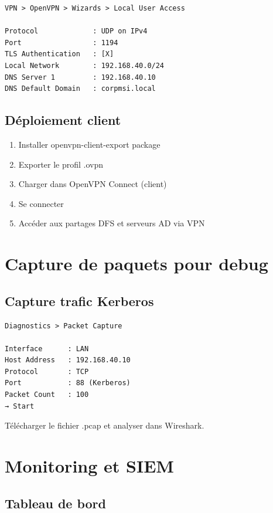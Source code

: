 \begin{lstlisting}
VPN > OpenVPN > Wizards > Local User Access

Protocol             : UDP on IPv4
Port                 : 1194
TLS Authentication   : [X]
Local Network        : 192.168.40.0/24
DNS Server 1         : 192.168.40.10
DNS Default Domain   : corpmsi.local
\end{lstlisting}

\subsection{Déploiement client}

\begin{enumerate}
    \item Installer openvpn-client-export package
    \item Exporter le profil .ovpn
    \item Charger dans OpenVPN Connect (client)
    \item Se connecter
    \item Accéder aux partages DFS et serveurs AD via VPN
\end{enumerate}

\section{Capture de paquets pour debug}

\subsection{Capture trafic Kerberos}

\begin{lstlisting}
Diagnostics > Packet Capture

Interface      : LAN
Host Address   : 192.168.40.10
Protocol       : TCP
Port           : 88 (Kerberos)
Packet Count   : 100
→ Start
\end{lstlisting}

Télécharger le fichier .pcap et analyser dans Wireshark.

\section{Monitoring et SIEM}

\subsection{Tableau de bord}

